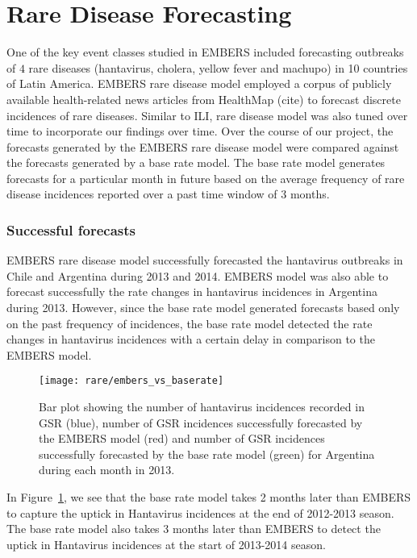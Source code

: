 \section{Rare Disease Forecasting}

One of the key event classes studied in EMBERS included forecasting outbreaks
of $4$ rare diseases (hantavirus, cholera, yellow fever and machupo) in 10
countries of Latin America. EMBERS rare disease model employed a corpus of
publicly available health-related news articles from HealthMap (cite) to
forecast discrete incidences of rare diseases. Similar to ILI, rare disease
model was also tuned over time to incorporate our findings over time. Over the
course of our project, the forecasts generated by the EMBERS rare disease
model were compared against the forecasts generated by a base rate model. The
base rate model generates forecasts for a particular month in future based on
the average frequency of rare disease incidences reported over a past time
window of 3 months.


\subsubsection{Successful forecasts}

EMBERS rare disease model successfully forecasted the hantavirus outbreaks in
Chile and Argentina during 2013 and 2014. EMBERS model was also able to
forecast successfully the rate changes in hantavirus incidences in Argentina
during 2013. However, since the base rate model generated forecasts based only
on the past frequency of incidences, the base rate model detected the rate
changes in hantavirus incidences with a certain delay in comparison to the
EMBERS model. 

\begin{figure}
  \texttt{[image: rare/embers\_vs\_baserate]}
  \caption{\label{fig:embers_vs_baserate} Bar plot showing the number of
  hantavirus incidences recorded in GSR (blue), number of GSR incidences
  successfully forecasted by the EMBERS model (red) and number of GSR
  incidences successfully forecasted by the base rate model (green) for
  Argentina during each month in 2013.}
\end{figure}

In Figure~\ref{fig:embers_vs_baserate}, we see that the base rate model takes
2 months later than EMBERS to capture the uptick in Hantavirus incidences at
the end of 2012-2013 season. The base rate model also takes 3 months later
than EMBERS to detect the uptick in Hantavirus incidences at the start of
2013-2014 season. 


